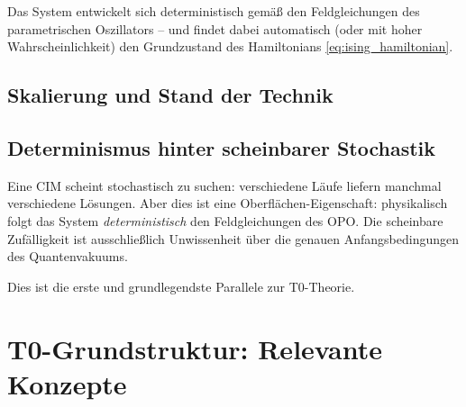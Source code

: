 Das System entwickelt sich deterministisch gemäß den Feldgleichungen des 
parametrischen Oszillators -- und findet dabei automatisch (oder mit hoher 
Wahrscheinlichkeit) den Grundzustand des Hamiltonians \eqref{eq:ising_hamiltonian}.

\subsection{Skalierung und Stand der Technik}

\begin{table}[h]
    \centering
    \caption{Vergleich: Klassischer Rechner vs.\ Coherent Ising Machine}
    \label{tab:cim_vs_classical}
\end{table}

\subsection{Determinismus hinter scheinbarer Stochastik}
\label{subsec:cim_determinism}

Eine CIM scheint stochastisch zu suchen: verschiedene Läufe liefern manchmal 
verschiedene Lösungen. Aber dies ist eine Oberflächen-Eigenschaft: physikalisch 
folgt das System \emph{deterministisch} den Feldgleichungen des OPO. Die scheinbare 
Zufälligkeit ist ausschließlich Unwissenheit über die genauen Anfangsbedingungen 
des Quantenvakuums.

Dies ist die erste und grundlegendste Parallele zur T0-Theorie.

\clearpage

\section{T0-Grundstruktur: Relevante Konzepte}
\label{sec:t0}

